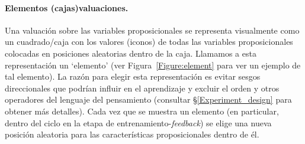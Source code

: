 \paragraph{Elementos (cajas)\textemdash valuaciones.} Una valuación sobre las variables proposicionales se representa visualmente como un cuadrado/caja con los valores (iconos) de todas las variables proposicionales colocadas en posiciones aleatorias dentro de la caja. Llamamos a esta representación un `elemento' (ver Figura~\ref{Figure:element} para ver un ejemplo de tal elemento). La razón para elegir esta representación es evitar sesgos direccionales que podrían influir en el aprendizaje y excluir el orden y otros operadores del lenguaje del pensamiento (consultar \S\ref{Experiment_design} para obtener más detalles).
Cada vez que se muestra un elemento (en particular, dentro del ciclo en la etapa de entrenamiento-{\em feedback}) se elige una nueva posición aleatoria para las características proposicionales dentro de él.


